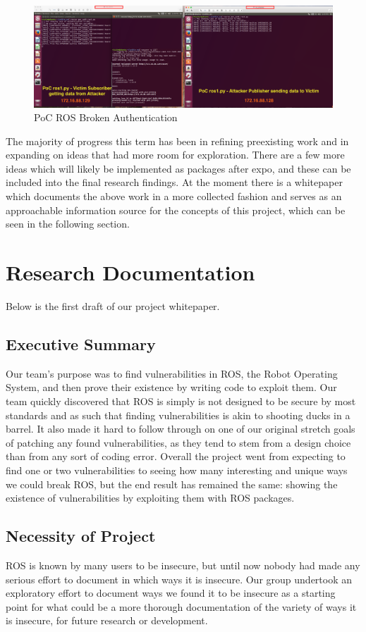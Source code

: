 \documentclass[IEEEtran,letterpaper,10pt,notitlepage,draftclsnofoot,onecolumn]{article}
\begin{document}
\begin{figure}
  \centering
    \includegraphics[width=\textwidth]{poc1}
    \caption{PoC ROS Broken Authentication}
\end{figure}


The majority of progress this term has been in refining preexisting work and in expanding on ideas that had more room for exploration.
There are a few more ideas which will likely be implemented as packages after expo, and these can be included into the final research findings.
At the moment there is a whitepaper which documents the above work in a more collected fashion and serves as an approachable information source for the concepts of this project, which can be seen in the following section.

\section{Research Documentation}
Below is the first draft of our project whitepaper.
\subsection{Executive Summary}
Our team’s purpose was to find vulnerabilities in ROS, the Robot Operating System, and then prove their existence by writing code to exploit them. 
Our team quickly discovered that ROS is simply is not designed to be secure by most standards and as such that finding vulnerabilities is akin to shooting ducks in a barrel. 
It also made it hard to follow through on one of our original stretch goals of patching any found vulnerabilities, as they tend to stem from a design choice than from any sort of coding error. 
Overall the project went from expecting to find one or two vulnerabilities to seeing how many interesting and unique ways we could break ROS, but the end result has remained the same: showing the existence of vulnerabilities by exploiting them with ROS packages.


\subsection{Necessity of Project}
ROS is known by many users to be insecure, but until now nobody had made any serious effort to document in which ways it is insecure. 
Our group undertook an exploratory effort to document ways we found it to be insecure as a starting point for what could be a more thorough documentation of the variety of ways it is insecure, for future research or development. 
\end{document}
